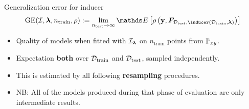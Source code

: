 





\begin{vbframe}{Generalization error for inducer}
  $$\GEfull := 
  \lim_{\ntest \rightarrow \infty} \E \left[ \rho \left(
  \yv, \F_{\Dtest, \inducer(\D_{\mathrm{train}}, \lamv)} 
  \right)\right]$$

\begin{itemize}
  \item Quality of models when fitted with $\mathcal{I}_{\bm{\lambda}}$ on 
      $n_{\mathrm{train}}$ points from $\mathbb{P}_{xy}$.
  \item Expectation \textbf{both} over $\mathcal{D}_{\text{train}}$ and $\mathcal{D}_{\text{test}}$, sampled independently.
  \item This is estimated by all following \textbf{resampling} procedures. 
  \item NB: All of the models produced during that phase of evaluation are only
    intermediate results.
\end{itemize}
\end{vbframe}

